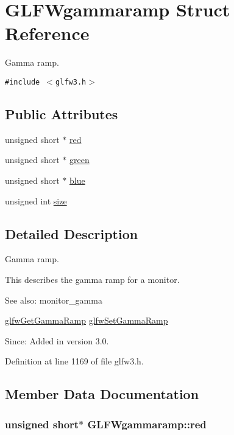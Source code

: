 \hypertarget{struct_g_l_f_wgammaramp}{
\section{GLFWgammaramp Struct Reference}
\label{struct_g_l_f_wgammaramp}
}
Gamma ramp.  


{\tt \#include $<$glfw3.h$>$}

\subsection*{Public Attributes}
\begin{CompactItemize}
\item 
unsigned short $\ast$ \hyperlink{struct_g_l_f_wgammaramp_2cce5d968734b685623eef913e635138}{red}
\item 
unsigned short $\ast$ \hyperlink{struct_g_l_f_wgammaramp_ffccc6f5df47820b6562d709da3a5a3a}{green}
\item 
unsigned short $\ast$ \hyperlink{struct_g_l_f_wgammaramp_cf0c836d0efe29c392fe8d1a1042744b}{blue}
\item 
unsigned int \hyperlink{struct_g_l_f_wgammaramp_d620e1cffbff9a32c51bca46301b59a5}{size}
\end{CompactItemize}


\subsection{Detailed Description}
Gamma ramp. 

This describes the gamma ramp for a monitor.

\begin{Desc}
\item[See also:]monitor\_\-gamma 

\hyperlink{group__monitor_geeac9198f3c91b83440eed679441f76b}{glfwGetGammaRamp} \hyperlink{group__monitor_gc9f36a1cfa10eab191d3029ea8bc9558}{glfwSetGammaRamp}\end{Desc}
\begin{Desc}
\item[Since:]Added in version 3.0. \end{Desc}


Definition at line 1169 of file glfw3.h.

\subsection{Member Data Documentation}
\hypertarget{struct_g_l_f_wgammaramp_2cce5d968734b685623eef913e635138}{
\subsubsection[red]{\setlength{\rightskip}{0pt plus 5cm}unsigned short$\ast$ {\bf GLFWgammaramp::red}}}
\label{struct_g_l_f_wgammaramp_2cce5d968734b685623eef913e635138}


